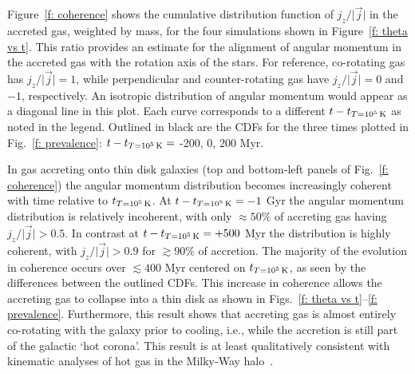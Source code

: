 \documentclass[fleqn,usenatbib]{mnras}
\newcommand{\tcon}{t_{T=10^5\,{\rm K}}}
\begin{document}
Figure~\ref{f: coherence} shows the cumulative distribution function of $j_z / \vert \vec j \vert$ in the accreted gas, weighted by mass, for the four simulations shown in Figure~\ref{f: theta vs t}. This ratio provides an estimate for the alignment of  angular momentum in the accreted gas with the rotation axis of the stars. For reference, co-rotating gas has $j_z / \vert \vec j \vert = 1$, while perpendicular and counter-rotating gas have $j_z / \vert \vec j \vert = 0$ and $-1$, respectively. An isotropic distribution of angular momentum would appear as a diagonal line in this plot. 
Each curve corresponds to a different $t - \tcon$ as noted in the legend. 
Outlined in black are the CDFs for the three times plotted in Fig.~\ref{f: prevalence}: $t - \tcon =$ -200, 0, 200 Myr.

In gas accreting onto thin disk galaxies (top and bottom-left panels of Fig.~\ref{f: coherence})  the angular momentum distribution becomes increasingly coherent with time relative to $\tcon$. At $t-\tcon=-1$ Gyr the angular momentum distribution is relatively incoherent, with only $\approx50\%$ of accreting gas having $j_z/\vert \vec j \vert > 0.5$. In contrast at $t-\tcon=+500$ Myr the distribution is highly coherent, with $j_z/\vert \vec j \vert > 0.9$ for $\gtrsim 90\%$ of accretion.
The majority of the evolution in coherence occurs over $\lesssim 400$ Myr centered on $\tcon$, as seen by the differences between the outlined CDFs. This increase in coherence allows the accreting gas to collapse into a thin disk as shown in Figs.~\ref{f: theta vs t}--\ref{f: prevalence}. Furthermore, this result shows that accreting gas is almost entirely co-rotating with the galaxy prior to cooling, i.e., while the accretion is still part of the galactic `hot corona'. This result is at least qualitatively consistent with kinematic analyses of hot gas in the Milky-Way halo~\citep{Hodges-Kluck2016}.

\end{document}
